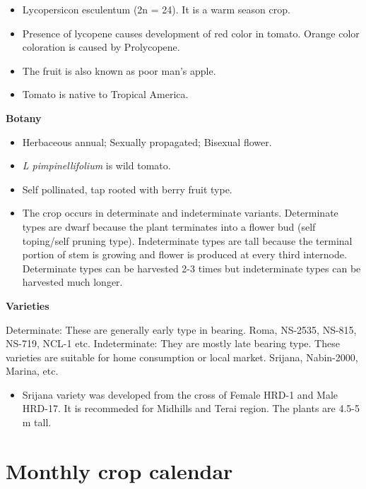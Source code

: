 \documentclass[
  openany]{book}
\providecommand{\tightlist}{%
  \setlength{\itemsep}{0pt}\setlength{\parskip}{0pt}}
\begin{document}
\begin{itemize}
\tightlist
\item
  Lycopersicon esculentum (2n = 24). It is a warm season crop.
\item
  Presence of lycopene causes development of red color in tomato. Orange color coloration is caused by Prolycopene.
\item
  The fruit is also known as poor man's apple.
\item
  Tomato is native to Tropical America.
\end{itemize}

\textbf{Botany}

\begin{itemize}
\tightlist
\item
  Herbaceous annual; Sexually propagated; Bisexual flower.
\item
  \emph{L pimpinellifolium} is wild tomato.
\item
  Self pollinated, tap rooted with berry fruit type.
\item
  The crop occurs in determinate and indeterminate variants. Determinate types are dwarf because the plant terminates into a flower bud (self toping/self pruning type). Indeterminate types are tall because the terminal portion of stem is growing and flower is produced at every third internode. Determinate types can be harvested 2-3 times but indeterminate types can be harvested much longer.
\end{itemize}

\textbf{Varieties}

Determinate: These are generally early type in bearing. Roma, NS-2535, NS-815, NS-719, NCL-1 etc.
Indeterminate: They are mostly late bearing type. These varieties are suitable for home consumption or local market. Srijana, Nabin-2000, Marina, etc.

\begin{itemize}
\tightlist
\item
  Srijana variety was developed from the cross of Female HRD-1 and Male HRD-17. It is recommeded for Midhills and Terai region. The plants are 4.5-5 m tall.
\end{itemize}

\hypertarget{monthly-crop-calendar}{%
\section{Monthly crop calendar}\label{monthly-crop-calendar}}
\end{document}
